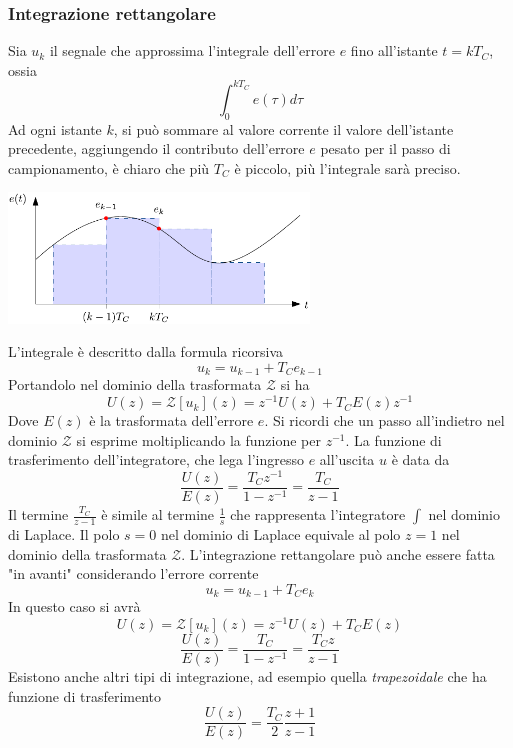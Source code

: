 \documentclass[10pt, letterpaper]{report}
\begin{document}
\subsubsection{Integrazione rettangolare}
Sia $u_k$ il segnale che approssima l'integrale dell'errore $e$ fino all'istante $t=kT_C$, ossia 
$$ \int_0^{kT_C} e(\tau)d\tau$$
Ad ogni istante $k$, si può sommare al valore corrente il valore dell'istante precedente, aggiungendo il contributo dell'errore $e$ pesato per il passo di campionamento, è chiaro che più $T_C$ è piccolo, più l'integrale sarà preciso.
\begin{center}
    \includegraphics[width=0.6\textwidth]{images/integraleRett.pdf}
\end{center}
L'integrale è descritto dalla formula ricorsiva 
$$u_k=u_{k-1}+T_Ce_{k-1} $$
Portandolo nel dominio della trasformata $\mathcal{Z}$ si ha 
$$ U(z)=\mathcal{Z}[u_k](z)=z^{-1}U(z)+T_CE(z)z^{-1}$$
Dove $E(z)$ è la trasformata dell'errore $e$. Si ricordi che un passo all'indietro nel dominio $\mathcal{Z}$ si esprime moltiplicando la funzione per $z^{-1}$. \acc 
La funzione di trasferimento dell'integratore, che lega l'ingresso $e$ all'uscita $u$ è data da 
$$ \frac{U(z)}{E(z)}=\frac{T_Cz^{-1}}{1-z^{-1}}=\frac{T_C}{z-1}$$
Il termine $\frac{T_C}{z-1}$ è simile al termine $\frac{1}{s}$ che rappresenta l'integratore $\int$ nel dominio di Laplace. Il polo $s=0$ nel dominio di Laplace equivale al polo $z=1$ nel dominio della trasformata $\mathcal{Z}$.\acc 
L'integrazione rettangolare può anche essere fatta "in avanti" considerando l'errore corrente 
$$u_k=u_{k-1}+T_Ce_{k} $$
In questo caso si avrà 
$$ U(z)=\mathcal{Z}[u_k](z)=z^{-1}U(z)+T_CE(z)$$
$$ \frac{U(z)}{E(z)}=\frac{T_C}{1-z^{-1}}=\frac{T_Cz}{z-1}$$
Esistono anche altri tipi di integrazione, ad esempio quella \textit{trapezoidale} che ha funzione di trasferimento 
$$ \frac{U(z)}{E(z)}=\frac{T_C}{2}\frac{z+1}{z-1}$$
\end{document}
